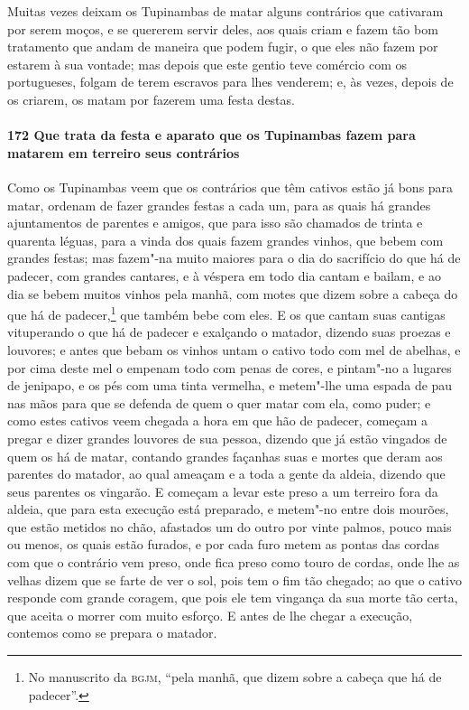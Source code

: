 Muitas vezes deixam os Tupinambas de matar alguns contrários que cativaram por serem
moços, e se quererem servir deles, aos quais criam e fazem tão bom tratamento que andam de
maneira que podem fugir, o que eles não fazem por estarem à sua vontade; mas depois que
este gentio teve comércio com os portugueses, folgam de terem escravos para lhes venderem;
e, às vezes, depois de os criarem, os matam por fazerem uma festa destas.

\paragraph{172 Que trata da festa e aparato que os Tupinambas fazem para matarem em
terreiro seus contrários}

Como os Tupinambas veem que os contrários que têm cativos estão já bons para matar,
ordenam de fazer grandes festas a cada um, para as quais há grandes ajuntamentos de
parentes e amigos, que para isso são chamados de trinta e quarenta léguas, para a vinda
dos quais fazem grandes vinhos, que bebem com grandes festas; mas fazem"-na muito maiores
para o dia do sacrifício do que há de padecer, com grandes cantares, e à véspera em todo
dia cantam e bailam, e ao dia se bebem muitos vinhos pela manhã, com motes que dizem sobre
a cabeça do que há de padecer,\footnote{ No manuscrito da \textsc{bgjm}, ``pela manhã, que
dizem sobre a cabeça que há de padecer''.} que também bebe com eles. E os que cantam suas
cantigas vituperando o que há de padecer e exalçando o matador, dizendo suas proezas e
louvores; e antes que bebam os vinhos untam o cativo todo com mel de abelhas, e por cima
deste mel o empenam todo com penas de cores, e pintam"-no a lugares de jenipapo, e os pés
com uma tinta vermelha, e metem"-lhe uma espada de pau nas mãos para que se defenda de quem
o quer matar com ela, como puder; e como estes cativos veem chegada a hora em que hão de
padecer, começam a pregar e dizer grandes louvores de sua pessoa, dizendo que já estão
vingados de quem os há de matar, contando grandes façanhas suas e mortes que deram aos
parentes do matador, ao qual ameaçam e a toda a gente da aldeia, dizendo que seus parentes
os vingarão. E começam a levar este preso a um terreiro fora da aldeia, que para esta
execução está preparado, e metem"-no entre dois mourões, que estão metidos no chão,
afastados um do outro por vinte palmos, pouco mais ou menos, os quais estão furados, e por
cada furo metem as pontas das cordas com que o contrário vem preso, onde fica preso como
touro de cordas, onde lhe as velhas dizem que se farte de ver o sol, pois tem o fim tão
chegado; ao que o cativo responde com grande coragem, que pois ele tem vingança da sua
morte tão certa, que aceita o morrer com muito esforço. E antes de lhe chegar a execução,
contemos como se prepara o matador.

